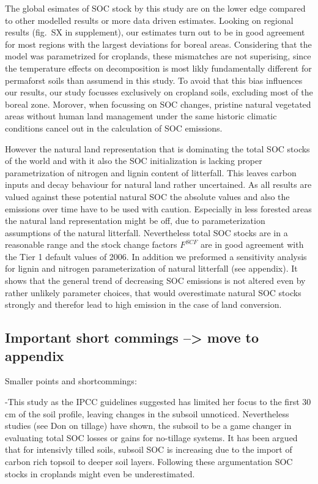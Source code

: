 \documentclass[gc, manuscript]{copernicus}
\begin{document}
The global esimates of SOC stock by this study are on the lower edge
compared to other modelled results or more data driven estimates.
Looking on regional results (fig.~SX in supplement), our estimates turn
out to be in good agreement for most regions with the largest deviations
for boreal areas. Considering that the model was parametrized for
croplands, these mismatches are not superising, since the temperature
effects on decomposition is most likly fundamentally different for
permaforst soils than assumend in this study. To avoid that this bias
influences our results, our study focusses exclusively on cropland
soils, excluding most of the boreal zone. Morover, when focussing on SOC
changes, pristine natural vegetated areas without human land management
under the same historic climatic conditions cancel out in the
calculation of SOC emissions.

However the natural land representation that is dominating the total SOC
stocks of the world and with it also the SOC initialization is lacking
proper parametrization of nitrogen and lignin content of litterfall.
This leaves carbon inputs and decay behaviour for natural land rather
uncertained. As all results are valued against these potential natural
SOC the absolute values and also the emissions over time have to be used
with caution. Especially in less forested areas the natural land
representation might be off, due to parameterization assumptions of the
natural litterfall. Nevertheless total SOC stocks are in a reasonable
range and the stock change factors \(F^{SCF}\) are in good agreement
with the Tier 1 default values of 2006. In addition we preformed a
sensitivity analysis for lignin and nitrogen parameterization of natural
litterfall (see appendix). It shows that the general trend of decreasing
SOC emissions is not altered even by rather unlikely parameter choices,
that would overestimate natural SOC stocks strongly and therefor lead to
high emission in the case of land conversion.

\subsection{Important short commings --\textgreater{} move to appendix}

Smaller points and shortcommings:

-This study as the IPCC guidelines suggested has limited her focus to
the first 30 cm of the soil profile, leaving changes in the subsoil
unnoticed. Nevertheless studies (see Don on tillage) have shown, the
subsoil to be a game changer in evaluating total SOC losses or gains for
no-tillage systems. It has been argued that for intensivly tilled soils,
subsoil SOC is increasing due to the import of carbon rich topsoil to
deeper soil layers. Following these argumentation SOC stocks in
croplands might even be underestimated.
\end{document}
